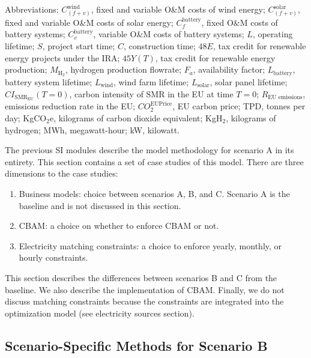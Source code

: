 \documentclass{article}
\begin{document}
\begin{table}[H]
\begin{threeparttable}
\begin{tablenotes}
  \item Abbreviations: $C_{(f+v)}^{\text{wind}}$, fixed and variable O\&M costs of wind energy; $C_{(f+v)}^{\text{solar}}$, fixed and variable O\&M costs of solar energy; $C_f^{\text{battery}}$, fixed O\&M costs of battery systems; $C_v^{\text{battery}}$, variable O\&M costs of battery systems; $L$, operating lifetime; $S$, project start time; $C$, construction time; $48E$, tax credit for renewable energy projects under the IRA; $45Y(T)$, tax credit for renewable energy production; $M_{\text{H}_2}$, hydrogen production flowrate; $F_a$, availability factor; $L_{\text{battery}}$, battery system lifetime; $L_{\text{wind}}$, wind farm lifetime; $L_{\text{solar}}$, solar panel lifetime; $CI_{\text{SMR}_{\text{EU}}}(T=0)$, carbon intensity of SMR in the EU at time $T=0$; $R_{\text{EU emissions}}$, emissions reduction rate in the EU; $CO_2^{\text{EUPrice}}$, EU carbon price; TPD, tonnes per day; KgCO$_2$e, kilograms of carbon dioxide equivalent; KgH$_2$, kilograms of hydrogen; MWh, megawatt-hour; kW, kilowatt.
\end{tablenotes}

  \end{threeparttable}
\end{table}

The previous SI modules describe the model methodology for scenario A in its entirety. This section contains a set of case studies of this model. There are three dimensions to the case studies:
\begin{enumerate}
    \item Business models: choice between scenarios A, B, and C. Scenario A is the baseline and is not discussed in this section.
    \item CBAM: a choice on whether to enforce CBAM or not.
    \item Electricity matching constraints: a choice to enforce yearly, monthly, or hourly constraints.
\end{enumerate}
This section describes the differences between scenarios B and C from the baseline. We also describe the implementation of CBAM. Finally, we do not discuss matching constraints because the constraints are integrated into the optimization model (see electricity sources section).

\subsection{Scenario-Specific Methods for Scenario B}
\end{document}
